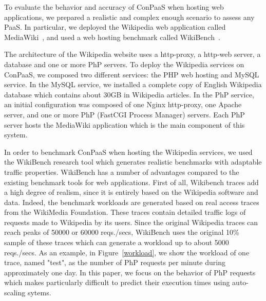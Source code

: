 To evaluate the behavior and accuracy of ConPaaS when hosting web applications, we prepared a realistic and complex enough scenario to assess any PaaS. In particular, we deployed the Wikipedia web application called MediaWiki~\cite{mediawiki}, and used a web hosting benchmark called WikiBench~\cite{wikibench}. 


The architecture of the Wikipedia website uses a http-proxy, a http-web server, a database and one or more PhP servers. To deploy the Wikipedia services on ConPaaS, we composed two different services: the PHP web hosting and MySQL service. In the MySQL service, we installed a complete copy of English Wikipedia database which contains about 30GB in Wikipedia articles. In the PhP service, an initial configuration was composed of one Nginx http-proxy, one Apache server, and one or more PhP (FastCGI Process Manager) servers. Each PhP server hosts the MediaWiki application which is the main component of this system. 



In order to benchmark ConPaaS when hosting the Wikipedia services, we used the WikiBench research tool which generates realistic benchmarks with adaptable traffic properties. WikiBench has a number of advantages compared to the existing benchmark tools for web applications. First of all, Wikibench traces add a high degree of realism, since it is entirely based on the Wikipedia software and data. Indeed, the benchmark workloads are generated based on real access traces from the WikiMedia Foundation. These traces contain detailed  traffic logs of requests made to Wikipedia by its users. Since the original Wikipedia traces can reach peaks of 50000 or 60000 reqs./secs, WikiBench uses the original 10\% sample of these traces which can generate a workload up to about 5000 reqs./secs. As an example, in Figure~\ref{workload}, we show the workload of one trace, named "test", as the number of PhP requests per minute during approximately one day.  In this paper, we focus on the behavior of PhP requests which makes particularly difficult to predict their execution times using auto-scaling sytems. 

